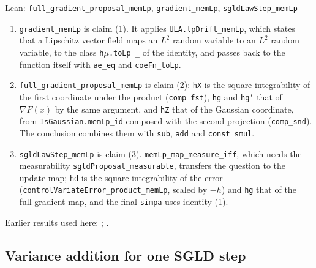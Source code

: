 \documentclass[11pt,a4paper]{report}
\begin{document}
\begin{leanbox}{Lean: \texttt{full\_\allowbreak{}gradient\_\allowbreak{}proposal\_\allowbreak{}memLp}, \texttt{gradient\_\allowbreak{}memLp}, \texttt{sgldLawStep\_\allowbreak{}memLp}}
\begin{enumerate}


\item \texttt{gradient\_\allowbreak{}mem\allowbreak{}Lp} is claim (1). It applies \texttt{ULA.\allowbreak{}lp\allowbreak{}Drift\_\allowbreak{}mem\allowbreak{}Lp}, which states that a Lipschitz vector field maps an \(L^2\) random variable to an \(L^2\) random variable, to the class \texttt{h\ensuremath{\mu}.\allowbreak{}to\allowbreak{}Lp \_\allowbreak{}} of the identity, and passes back to the function itself with \texttt{ae\_\allowbreak{}eq} and \texttt{coe\allowbreak{}Fn\_\allowbreak{}to\allowbreak{}Lp}.

\item \texttt{full\_\allowbreak{}gradient\_\allowbreak{}proposal\_\allowbreak{}mem\allowbreak{}Lp} is claim (2): \texttt{h\allowbreak{}X} is the square integrability of the first coordinate under the product (\texttt{comp\_\allowbreak{}fst}), \texttt{hg} and \texttt{hg'} that of \(\nabla F(x)\) by the same argument, and \texttt{h\allowbreak{}Z} that of the Gaussian coordinate, from \texttt{Is\allowbreak{}Gaussian.\allowbreak{}mem\allowbreak{}Lp\_\allowbreak{}id} composed with the second projection (\texttt{comp\_\allowbreak{}snd}). The conclusion combines them with \texttt{sub}, \texttt{add} and \texttt{const\_\allowbreak{}smul}.

\item \texttt{sgld\allowbreak{}Law\allowbreak{}Step\_\allowbreak{}mem\allowbreak{}Lp} is claim (3). \texttt{mem\allowbreak{}Lp\_\allowbreak{}map\_\allowbreak{}measure\_\allowbreak{}iff}, which needs the measurability \texttt{sgld\allowbreak{}Proposal\_\allowbreak{}measurable}, transfers the question to the update map; \texttt{hd} is the square integrability of the error (\texttt{control\allowbreak{}Variate\allowbreak{}Error\_\allowbreak{}product\_\allowbreak{}mem\allowbreak{}Lp}, scaled by \(-h\)) and \texttt{hg} that of the full-gradient map, and the final \texttt{simpa} uses identity (1).

\end{enumerate}
\end{leanbox}


Earlier results used here: \cite[Section~3.13.4]{LangevinLean2026ULASC}; \cite[Section~3.34.1]{LangevinLean2026ULASC}.
\subsection{\texorpdfstring{Variance addition for one SGLD step}{Variance addition for one SGLD step}}
\label{report-step-AverageLMC-SGLDLaw-lean-3}
\end{document}
